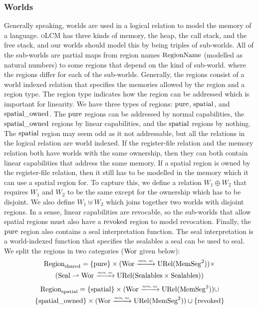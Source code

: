 \documentclass[acmsmall,review,anonymous]{acmart}\settopmatter{printfolios=true,printccs=false,printacmref=false}
\renewcommand{\MemSeg}{\shareddom{MemSeg}}
\renewcommand{\SealableCaps}{\shareddom{Sealables}}
\newcommand{\srccm}{\textsc{oLCM}}
\begin{document}
\subsubsection{Worlds}
Generally speaking, worlds are used in a logical relation to model the memory of a language.
\srccm{} has three kinds of memory, the heap, the call stack, and the free stack, and our worlds should model this by being triples of sub-worlds.
All of the sub-worlds are partial maps from region names $\mathrm{RegionName}$ (modelled as natural numbers) to some regions that depend on the kind of sub-world.
where the regions differ for each of the sub-worlds.
Generally, the regions consist of a world indexed relation that specifies the memories allowed by the region and a region type.
The region type indicates how the region can be addressed which is important for linearity.
We have three types of regions: $\mathrm{pure}$, $\mathrm{spatial}$, and $\mathrm{spatial\_owned}$.
The $\mathrm{pure}$ regions can be addressed by normal capabilities, the $\mathrm{spatial\_owned}$ regions by linear capabilities, and the $\mathrm{spatial}$ regions by nothing.
The $\mathrm{spatial}$ region may seem odd as it not addressable, but all the relations in the logical relation are world indexed.
If the register-file relation and the memory relation both have worlds with the same ownership, then they can both contain linear capabilities that address the same memory.
If a spatial region is owned by the register-file relation, then it still has to be modelled in the memory which it can use a spatial region for.
To capture this, we define a relation $W_1 \oplus W_2$ that requires $W_1$ and $W_2$ to be the same except for the ownership which has to be disjoint. We also define $W_1 \uplus W_2$ which joins together two worlds with disjoint regions.
In a sense, linear capabilities are revocable, so the sub-worlds that allow spatial regions must also have a $\mathrm{revoked}$ region to model revocation.
Finally, the $\mathrm{pure}$ region also contains a seal interpretation function.
The seal interpretation is a world-indexed function that specifies the sealables a seal can be used to seal.
We split the regions in two categories ($\mathrm{Wor}$ given below):
\begin{multline*}
  \Regionh = 
  \{\pure \} \times (\Wor \monnefun \URel{\MemSeg^2}) \times \\
  (\Seal \parfun \Wor \monnefun \URel{\SealableCaps \times \SealableCaps})
\end{multline*}
\begin{multline*}
  \Regions = 
    \{\spatial \} \times (\Wor \monnefun \URel{\MemSeg^2}) \cup \\
    \{\spatialo \} \times (\Wor \monnefun \URel{\MemSeg^2})\cup
    \{\revoked\}
\end{multline*}
\end{document}
